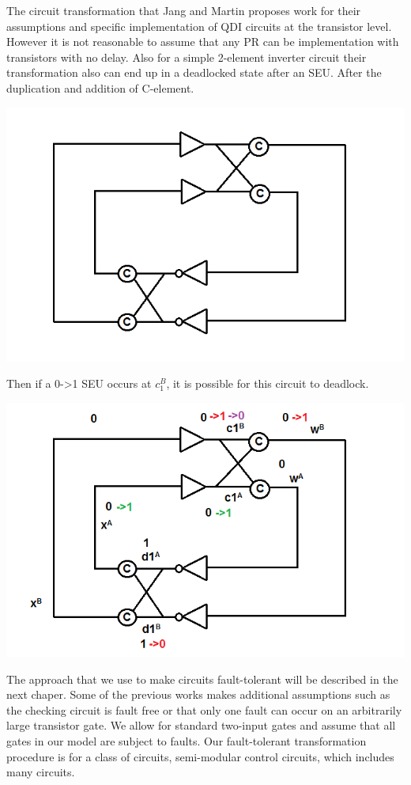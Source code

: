\documentclass[12pt]{report}
\begin{document}
The circuit transformation that Jang and Martin proposes work for their assumptions and specific implementation of QDI circuits at the transistor level.  However it is not reasonable to assume that any PR can be implementation with transistors with no delay.  Also for a simple 2-element inverter circuit their transformation also can end up in a deadlocked state after an SEU.  After the duplication and addition of C-element.  
\begin{center}
\includegraphics[width=.7\textwidth]{transfex}
\end{center}
Then if a 0->1 SEU occurs at $c_1^B$, it is possible for this circuit to deadlock.
\begin{center}
\includegraphics[width=.7\textwidth]{transfexc}
\end{center}

The approach that we use to make circuits fault-tolerant will be described in the next chaper.  Some of the previous works makes additional assumptions such as the checking circuit is fault free or that only one fault can occur on an arbitrarily large transistor gate.  We allow for standard two-input gates and assume that all gates in our model are subject to faults.  Our fault-tolerant transformation procedure is for a class of circuits, semi-modular control circuits, which includes many circuits.
\end{document}
